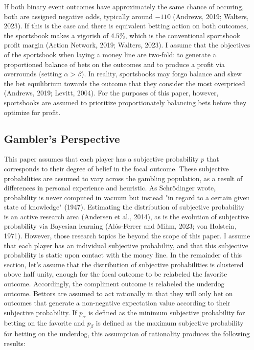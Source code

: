 \documentclass[sn-mathphys-num]{sn-jnl}
\theoremstyle{thmstyleone}%
\theoremstyle{thmstyletwo}%
\theoremstyle{thmstylethree}%
\begin{document}
If both binary event outcomes have approximately the same chance of occuring, both are assigned negative odds, typically around $-110$ (Andrews, 2019; Walters, 2023). If this is the case and there is equivalent betting action on both outcomes, the sportsbook makes a vigorish of $4.5\%$, which is the conventional sportsbook profit margin (Action Network, 2019; Walters, 2023). I assume that the objectives of the sportsbook when laying a money line are two-fold: to generate a proportioned balance of bets on the outcomes and to produce a profit via overrounds (setting $\alpha > \beta$). In reality, sportsbooks may forgo balance and skew the bet equilibrium towards the outcome that they consider the most overpriced (Andrews, 2019; Levitt, 2004). For the purposes of this paper, however, sportsbooks are assumed to prioritize proportionately balancing bets before they optimize for profit.

\subsection{Gambler's Perspective}

This paper assumes that each player has a subjective probability $p$ that corresponds to their degree of belief in the focal outcome. These subjective probabilities are assumed to vary across the gambling population, as a result of differences in personal experience and heuristic. As Schr\"{o}dinger wrote, probability is never computed in vacuum but instead "in regard to a certain given state of knowledge" (1947). Estimating the distribution of subjective probability is an active research area (Andersen et al., 2014), as is the evolution of subjective probability via Bayesian learning (Alós-Ferrer and Mihm, 2023; von Holstein, 1971). However, those research topics lie beyond the scope of this paper. I assume that each player has an individual subjective probability, and that this subjective probability is static upon contact with the money line. In the remainder of this section, let's assume that the distribution of subjective probabilities is clustered above half unity, enough for the focal outcome to be relabeled the favorite outcome. Accordingly, the compliment outcome is relabeled the underdog outcome. Bettors are assumed to act rationally in that they will only bet on outcomes that generate a non-negative expectation value according to their subjective probability. If $p_{\alpha}$ is defined as the minimum subjective probability for betting on the favorite and $p_{\beta}$ is defined as the maximum subjective probability for betting on the underdog, this assumption of rationality produces the following results:
\end{document}
